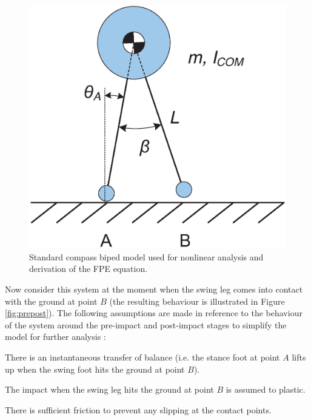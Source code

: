 \begin{figure}[!h]
	\centering
    \includegraphics[scale=0.4]{fig/fpe/fig1.eps}
  	\caption{Standard compass biped model used for nonlinear analysis  and derivation of the FPE equation.}
	\label{fig:compass}
\end{figure}

Now consider this system at the moment when the swing leg comes into contact with the ground at point $B$ (the resulting behaviour is illustrated in Figure \ref{fig:prepost}). The following assumptions are made in reference to the behaviour of the system around the pre-impact and post-impact stages to simplify the model for further analysis \cite{Wight:2008vt}: 

\hrulefill

\begin{assumption}
	There is an instantaneous transfer of balance (i.e. the stance foot at point $A$ lifts up when the swing foot hits the ground at point $B$).  
\end{assumption}

\begin{assumption}
	The impact when the swing leg hits the ground at point $B$ is assumed to plastic. 
\end{assumption}

\begin{assumption}
	There is sufficient friction to prevent any slipping at the contact points. 
\end{assumption}

